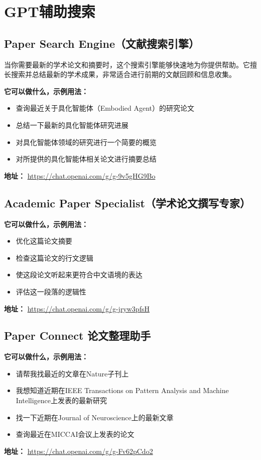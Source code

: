 \section{ GPT辅助搜索}\label{sec:intro}
\subsection{Paper Search Engine（文献搜索引擎）}
当你需要最新的学术论文和摘要时，这个搜索引擎能够快速地为你提供帮助。它擅长搜索并总结最新的学术成果，非常适合进行前期的文献回顾和信息收集。

\textbf{它可以做什么，示例用法：}
\begin{itemize}
    \item 查询最近关于具化智能体（Embodied Agent）的研究论文
    \item 总结一下最新的具化智能体研究进展
    \item 对具化智能体领域的研究进行一个简要的概览
    \item 对所提供的具化智能体相关论文进行摘要总结
\end{itemize}
\textbf{地址：} \url{https://chat.openai.com/g/g-9v5gHG9Bo}

\subsection{Academic Paper Specialist（学术论文撰写专家）}
\textbf{它可以做什么，示例用法：}
\begin{itemize}
    \item 优化这篇论文摘要
    \item 检查这篇论文的行文逻辑
    \item 使这段论文听起来更符合中文语境的表达
    \item 评估这一段落的逻辑性
\end{itemize}
\textbf{地址：} \url{https://chat.openai.com/g/g-jryw3pfsH}

\subsection{Paper Connect 论文整理助手}
\textbf{它可以做什么，示例用法：}
\begin{itemize}
    \item 请帮我找最近的文章在Nature子刊上
    \item 我想知道近期在IEEE Transactions on Pattern Analysis and Machine Intelligence上发表的最新研究
    \item 找一下近期在Journal of Neuroscience上的最新文章
    \item 查询最近在MICCAI会议上发表的论文
\end{itemize}
\textbf{地址：} \url{https://chat.openai.com/g/g-Fv62pCdo2}

